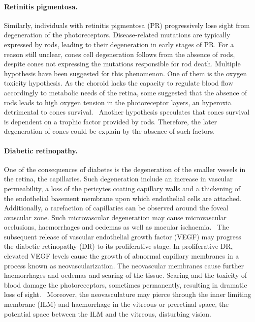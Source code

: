 \documentclass[12pt,a4paper]{journal}
\begin{document}
\paragraph*{Retinitis pigmentosa.}
Similarly, individuals with retinitis pigmentosa (PR) progressively lose sight from degeneration of the photoreceptors.
Disease-related mutations are typically expressed by rods, leading to their degeneration in early stages of PR.
For a reason still unclear, cones cell degeneration follows from the absence of rods, despite cones not expressing the mutations responsible for rod death.
Multiple hypothesis have been suggested for this phenomenon.
One of them is the oxygen toxicity hypothesis.
As the choroid lacks the capacity to regulate blood flow accordingly to metabolic needs of the retina, some suggested that the absence of rods leads to high oxygen tension in the photoreceptor layers, an hyperoxia detrimental to cones survival.~\cite{Roberts_2018,Stone_1999}
Another hypothesis speculates that cones survival is dependent on a trophic factor provided by rods.
Therefore, the later degeneration of cones could be explain by the absence of such factors.~\cite{Roberts_2022}\\

\paragraph*{Diabetic retinopathy.}
One of the consequences of diabetes is the degeneration of the smaller vessels in the retina, the capillaries.
Such degeneration include an increase in vascular permeability, a loss of the pericytes coating capillary walls and a thickening of the endothelial basement membrane upon which endothelial cells are attached.~\cite{Medina_2016}
Additionally, a rarefaction of capillaries can be observed around the foveal avascular zone.
Such microvascular degeneration may cause microvascular occlusions, haemorrhages and oedemas as well as macular ischaemia.~\cite{Medina_2016}
The subsequent release of vascular endothelial growth factor (VEGF) may progress the diabetic retinopathy (DR) to its proliferative stage.
In proliferative DR, elevated VEGF levels cause the growth of abnormal capillary membranes in a process known as neovascularization.
The neovascular membranes cause further haemorrhages and oedemas and scaring of the tissue.
Scaring and the toxicity of blood damage the photoreceptors, sometimes permanently, resulting in dramatic loss of sight.~\cite{Friedlander_2007,Gupta_2015}
Moreover, the neovasculature may pierce through the inner limiting membrane (ILM) and haemorrhage in the vitreous or preretinal space, the potential space between the ILM and the vitreous, disturbing vision.\\
\end{document}
